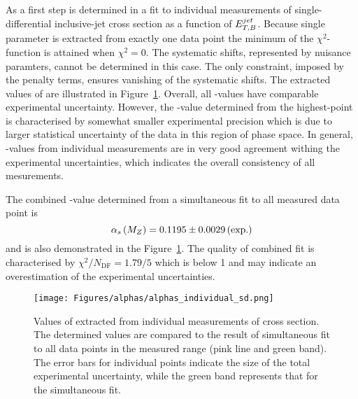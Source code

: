 As a first step \asz is determined in a fit to individual measurements of single-differential inclusive-jet cross section as a function of $\mbox{$E_{T,B}^{jet}$}$. Because single parameter is extracted from exactly one data point the minimum of the $\chi^2$-function is attained when $\chi^2=0$. The systematic shifts, represented by nuisance paramters, cannot be determined in this case. The only constraint, imposed by the penalty terms, ensures vanishing of the systematic shifts. The extracted values of \asz are illustrated in Figure~\ref{fig:alphassinglediffindividual}. Overall, all \as-values have comparable experimental uncertainty. However, the \as-value determined from the highest-\etjetb point is characterised by somewhat smaller experimental precision which is due to larger statistical uncertainty of the data in this region of phase space. In general, \as-values from individual measurements are in very good agreement withing the experimental uncertainties, which indicates the overall consistency of all mesurements.

The combined \asz-value determined from a simultaneous fit to all measured data point is
\begin{equation}
 \asz = 0.1195 \pm 0.0029 \left( \text{exp.} \right) %
 \label{eq:assingledifval}
\end{equation}
and is also demonstrated in the Figure~\ref{fig:alphassinglediffindividual}. The quality of combined fit is characterised by $\chi^2/N_\text{DF}=1.79/5$ which is below 1 and may indicate an overestimation of the experimental uncertainties.

\begin{figure}[tp]
 \begin{center}
 \texttt{[image: Figures/alphas/alphas\_individual\_sd.png]}
\end{center}
 \caption{Values of \asz extracted from individual measurements of \dsdetjetb cross section. The determined values are compared to the result of simultaneous fit to all data points in the measured \etjetb range (pink line and green band). The error bars for individual points indicate the size of the total experimental uncertainty, while the green band represents that for the simultaneous fit.}
 \label{fig:alphassinglediffindividual}
\end{figure}

